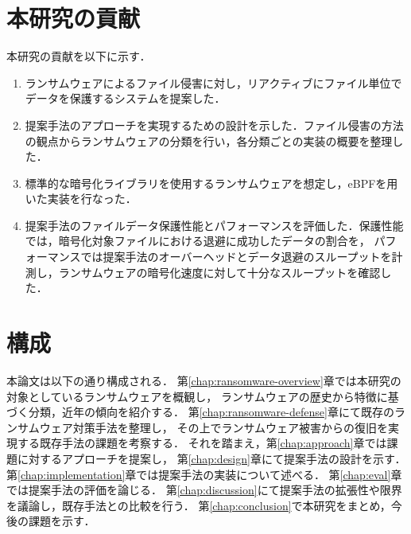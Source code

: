 \section{本研究の貢献}
本研究の貢献を以下に示す．
\begin{enumerate}
  \item ランサムウェアによるファイル侵害に対し，リアクティブにファイル単位でデータを保護するシステムを提案した．

  \item 提案手法のアプローチを実現するための設計を示した．ファイル侵害の方法の観点からランサムウェアの分類を行い，各分類ごとの実装の概要を整理した．

  \item 標準的な暗号化ライブラリを使用するランサムウェアを想定し，eBPFを用いた実装を行なった．

  \item 提案手法のファイルデータ保護性能とパフォーマンスを評価した．保護性能では，暗号化対象ファイルにおける退避に成功したデータの割合を，
        パフォーマンスでは提案手法のオーバーヘッドとデータ退避のスループットを計測し，ランサムウェアの暗号化速度に対して十分なスループットを確認した．
\end{enumerate}

\section{構成}
本論文は以下の通り構成される．
第\ref{chap:ransomware-overview}章では本研究の対象としているランサムウェアを概観し，
ランサムウェアの歴史から特徴に基づく分類，近年の傾向を紹介する．
第\ref{chap:ransomware-defense}章にて既存のランサムウェア対策手法を整理し，
その上でランサムウェア被害からの復旧を実現する既存手法の課題を考察する．
それを踏まえ，第\ref{chap:approach}章では課題に対するアプローチを提案し，
第\ref{chap:design}章にて提案手法の設計を示す．
第\ref{chap:implementation}章では提案手法の実装について述べる．
第\ref{chap:eval}章では提案手法の評価を論じる．
第\ref{chap:discussion}にて提案手法の拡張性や限界を議論し，既存手法との比較を行う．
第\ref{chap:conclusion}で本研究をまとめ，今後の課題を示す．
